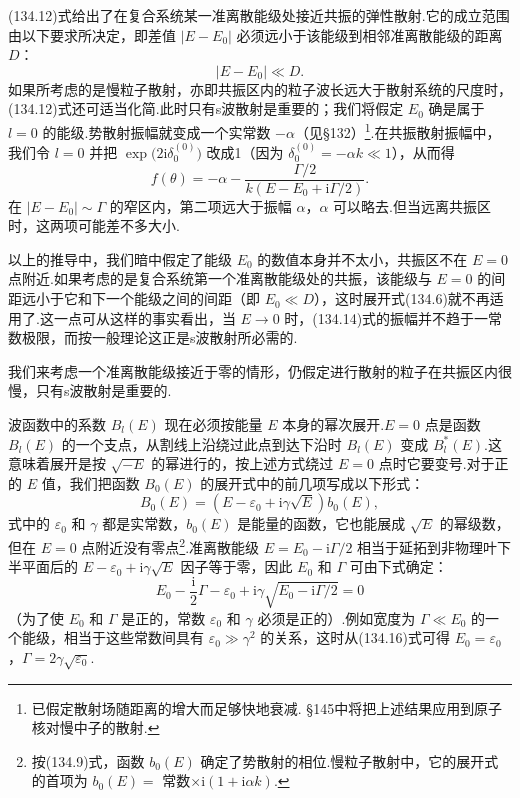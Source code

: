 (134.12)式给出了在复合系统某一准离散能级处接近共振的弹性散射.它的成立范围由以下要求所决定，即差值 $|E-E_0|$ 必须远小于该能级到相邻准离散能级的距离 $D$：
\begin{equation}
  |E-E_0|\ll D.
\end{equation}
如果所考虑的是慢粒子散射，亦即共振区内的粒子波长远大于散射系统的尺度时，(134.12)式还可适当化简.此时只有s波散射是重要的；我们将假定 $E_0$ 确是属于 $l=0$ 的能级.势散射振幅就变成一个实常数 $-\alpha$（见§132）\footnote{已假定散射场随距离的增大而足够快地衰减. §145中将把上述结果应用到原子核对慢中子的散射.}.在共振散射振幅中，我们令 $l=0$ 并把 $\exp\bigl(2\mathrm{i}\delta_0^{(0)}\bigr)$ 改成1（因为 $\delta_0^{(0)}=-\alpha k\ll1$），从而得
\begin{equation}
  f(\theta)=-\alpha-\frac{\Gamma/2}{k(E-E_0+\mathrm{i}\Gamma/2)}.
\end{equation}
在 $|E-E_0|\sim\Gamma$ 的窄区内，第二项远大于振幅 $\alpha$，$\alpha$ 可以略去.但当远离共振区时，这两项可能差不多大小.

以上的推导中，我们暗中假定了能级 $E_0$ 的数值本身并不太小，共振区不在 $E=0$ 点附近.如果考虑的是复合系统第一个准离散能级处的共振，该能级与 $E=0$ 的间距远小于它和下一个能级之间的间距（即 $E_0\ll D$），这时展开式(134.6)就不再适用了.这一点可从这样的事实看出，当 $E\to0$ 时，(134.14)式的振幅并不趋于一常数极限，而按一般理论这正是s波散射所必需的.

我们来考虑一个准离散能级接近于零的情形，仍假定进行散射的粒子在共振区内很慢，只有s波散射是重要的.

波函数中的系数 $B_l(E)$ 现在必须按能量 $E$ 本身的幂次展开.$E=0$ 点是函数 $B_l(E)$ 的一个支点，从割线上沿绕过此点到达下沿时 $B_l(E)$ 变成 $B_l^{*}(E)$.这意味着展开是按 $\sqrt{-E}$ 的幂进行的，按上述方式绕过 $E=0$ 点时它要变号.对于正的 $E$ 值，我们把函数 $B_0(E)$ 的展开式中的前几项写成以下形式：
\begin{equation}
  B_0(E)=\left(E-\varepsilon_0+\mathrm{i}\gamma\sqrt{E}\right)b_0(E),
\end{equation}
式中的 $\varepsilon_0$ 和 $\gamma$ 都是实常数，$b_0(E)$ 是能量的函数，它也能展成 $\sqrt{E}$ 的幂级数，但在 $E=0$ 点附近没有零点\footnote{按(134.9)式，函数 $b_0(E)$ 确定了势散射的相位.慢粒子散射中，它的展开式的首项为 $b_0(E)=$ 常数$\times\mathrm{i}(1+\mathrm{i}\alpha k)$.}.准离散能级 $E=E_0-\mathrm{i}\Gamma/2$ 相当于延拓到非物理叶下半平面后的 $E-\varepsilon_0+\mathrm{i}\gamma\sqrt{E}$ 因子等于零，因此 $E_0$ 和 $\Gamma$ 可由下式确定：
\begin{equation}
  E_0-\frac{\mathrm{i}}{2}\Gamma-\varepsilon_0
  +\mathrm{i}\gamma\sqrt{E_0-\mathrm{i}\Gamma/2}=0
\end{equation}
（为了使 $E_0$ 和 $\Gamma$ 是正的，常数 $\varepsilon_0$ 和 $\gamma$ 必须是正的）.例如宽度为 $\Gamma\ll E_0$ 的一个能级，相当于这些常数间具有 $\varepsilon_0\gg\gamma^2$ 的关系，这时从(134.16)式可得
$E_0=\varepsilon_0$，$\Gamma=2\gamma\sqrt{\varepsilon_0}$.

